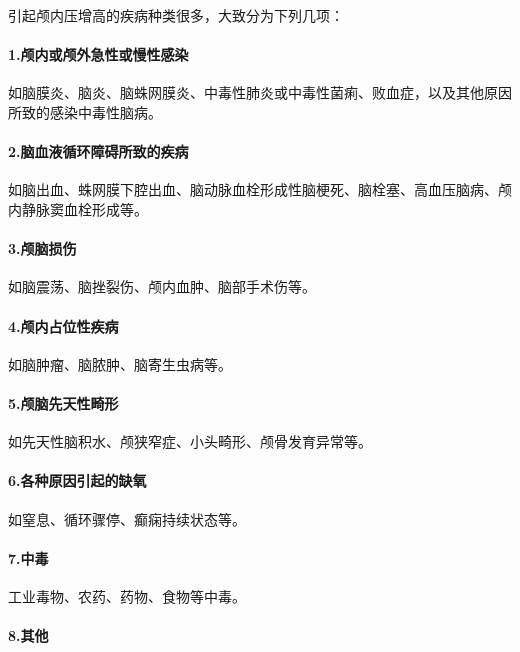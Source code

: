 引起颅内压增高的疾病种类很多，大致分为下列几项：

\paragraph{1.颅内或颅外急性或慢性感染}

如脑膜炎、脑炎、脑蛛网膜炎、中毒性肺炎或中毒性菌痢、败血症，以及其他原因所致的感染中毒性脑病。

\paragraph{2.脑血液循环障碍所致的疾病}

如脑出血、蛛网膜下腔出血、脑动脉血栓形成性脑梗死、脑栓塞、高血压脑病、颅内静脉窦血栓形成等。

\paragraph{3.颅脑损伤}

如脑震荡、脑挫裂伤、颅内血肿、脑部手术伤等。

\paragraph{4.颅内占位性疾病}

如脑肿瘤、脑脓肿、脑寄生虫病等。

\paragraph{5.颅脑先天性畸形}

如先天性脑积水、颅狭窄症、小头畸形、颅骨发育异常等。

\paragraph{6.各种原因引起的缺氧}

如窒息、循环骤停、癫痫持续状态等。

\paragraph{7.中毒}

工业毒物、农药、药物、食物等中毒。

\paragraph{8.其他}

